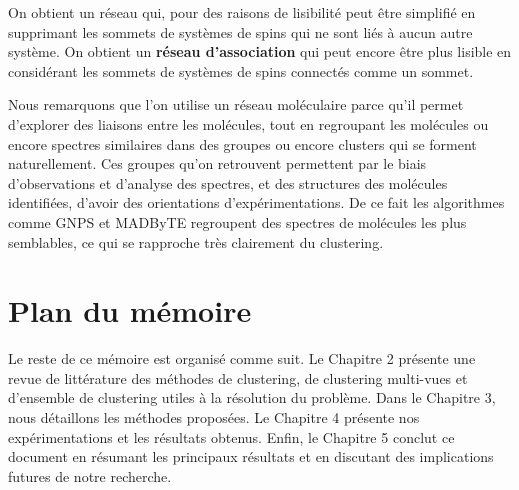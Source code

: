    	 On obtient un réseau qui, pour des raisons de lisibilité peut être simplifié en supprimant les sommets de systèmes de spins qui ne sont liés à aucun autre système.
   	 On obtient un \textbf{réseau d'association} qui peut encore être plus lisible en considérant les sommets de systèmes de spins connectés comme un sommet.

   	 Nous remarquons que l'on utilise un réseau moléculaire parce qu'il permet d'explorer des liaisons entre les molécules, tout en regroupant les molécules ou encore spectres similaires dans des groupes ou encore clusters qui se forment naturellement.
   	 Ces groupes qu'on retrouvent permettent par le biais d'observations et d'analyse des spectres, et des structures des molécules identifiées, d'avoir des orientations d'expérimentations.
   	 De ce fait les algorithmes comme GNPS et MADByTE regroupent des spectres de molécules les plus semblables, ce qui se rapproche très clairement du clustering.

\section{Plan du mémoire}

Le reste de ce mémoire est organisé comme suit.
Le Chapitre 2 présente %
une revue de littérature des méthodes de clustering, de clustering multi-vues et d’ensemble de clustering utiles à la résolution du problème.
Dans le Chapitre 3, nous détaillons les méthodes proposées.
Le Chapitre 4 présente nos expérimentations et les résultats obtenus.
Enfin, le Chapitre 5 conclut ce document en résumant les principaux résultats et en discutant des implications futures de notre recherche.

